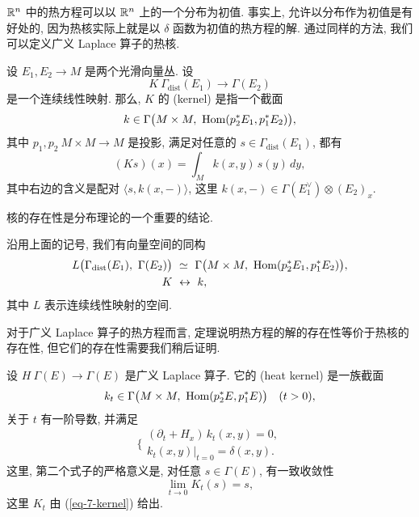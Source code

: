 $\mathbb{R}^n$ 中的热方程可以以 $\mathbb{R}^n$ 上的一个分布为初值.
事实上, 允许以分布作为初值是有好处的,
因为热核实际上就是以 $\delta$ 函数为初值的热方程的解.
通过同样的方法, 我们可以定义广义 Laplace 算子的热核.

\begin{definition}
    设 $E_1, E_2 \to M$ 是两个光滑向量丛. 设
    \[ K \: \Gamma_{\mathrm{dist}} (E_1) \to \Gamma (E_2) \]
    是一个连续线性映射. 那么, $K$ 的 (kernel) 是指一个截面
    \[ k \in \Gamma \bigl( M \times M, \ \operatorname{Hom} (p_2^* E_1, p_1^* E_2) \bigr), \]
    其中 $p_1, p_2 \: M \times M \to M$ 是投影,
    满足对任意的 $s \in \Gamma_{\mathrm{dist}} (E_1)$, 都有
    \begin{equation} \label{eq-7-kernel}
        (K s) (x) = \int_M k (x, y) \, s (y) \, dy,
    \end{equation}
    其中右边的含义是配对 $\langle s, k(x, -) \rangle$,
    这里 $k (x, -) \in \Gamma (E_1^\vee) \otimes (E_2)_x$.
\end{definition}

核的存在性是分布理论的一个重要的结论.

\begin{theorem} 
    沿用上面的记号, 我们有向量空间的同构
    \begin{align*}
        L \bigl( \Gamma_{\mathrm{dist}} (E_1), \ \Gamma (E_2) \bigr) \ 
            & \simeq \ \Gamma \bigl( M \times M, \ \Hom (p_2^* E_1, p_1^* E_2) \bigr), \\
        K \ & \leftrightarrow \ k,
    \end{align*} 
    其中 $L$ 表示连续线性映射的空间.
\end{theorem}

对于广义 Laplace 算子的热方程而言,
定理说明热方程的解的存在性等价于热核的存在性,
但它们的存在性需要我们稍后证明.

\begin{definition}
    设 $H \: \Gamma (E) \to \Gamma (E)$ 是广义 Laplace 算子.
    它的 (heat kernel) 是一族截面
    \[ k_t \in \Gamma \bigl( M \times M, \ \operatorname{Hom} (p_2^* E, p_1^* E) \bigr)
        \quad (t > 0), \]
    关于 $t$ 有一阶导数, 并满足
    \[ \Biggl \{ \begin{array}{l}
        (\partial_t + H_x) \, k_t (x, y) = 0, \\
        k_t (x, y) |_{t=0} = \delta (x, y).
    \end{array} \]
    这里, 第二个式子的严格意义是, 对任意 $s \in \Gamma(E)$, 有一致收敛性
    \[ \lim _{t \to 0} K_t (s) = s, \]
    这里 $K_t$ 由 (\ref{eq-7-kernel}) 给出.
\end{definition}

